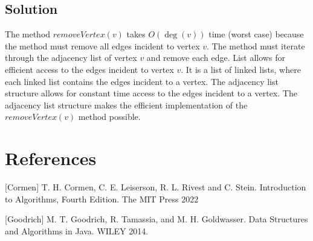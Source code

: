 \documentclass[10pt]{article}
\begin{document}
\subsection{Solution}

The method $removeVertex(v)$ takes $O(\operatorname{deg}(v))$ time (worst case) because the method must remove all edges incident to vertex $v$. The method must iterate through the adjacency list of vertex $v$ and remove each edge. List allows for efficient access to the edges incident to vertex $v$. It is a list of linked lists, where each linked list contains the edges incident to a vertex. The adjacency list structure allows for constant time access to the edges incident to a vertex. The adjacency list structure makes the efficient implementation of the $removeVertex(v)$ method possible.

\section*{References}
[Cormen] T. H. Cormen, C. E. Leiserson, R. L. Rivest and C. Stein. Introduction to Algorithms, Fourth Edition. The MIT Press 2022

[Goodrich] M. T. Goodrich, R. Tamassia, and M. H. Goldwasser. Data Structures and Algorithms in Java. WILEY 2014.
\end{document}
